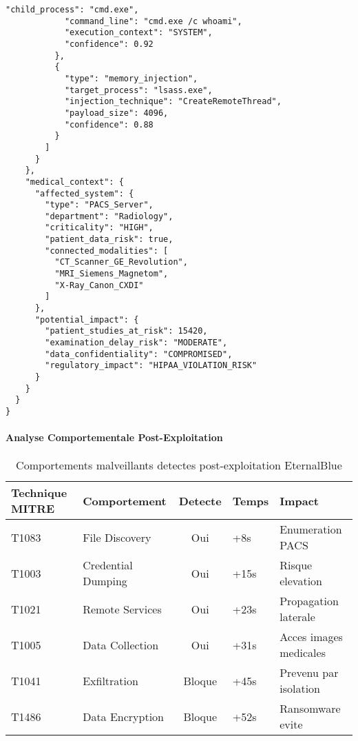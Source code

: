 \begin{lstlisting}[style=jsonstyle,caption=IOCs reseau extraits de l'incident EternalBlue]
            "child_process": "cmd.exe",
            "command_line": "cmd.exe /c whoami",
            "execution_context": "SYSTEM",
            "confidence": 0.92
          },
          {
            "type": "memory_injection",
            "target_process": "lsass.exe", 
            "injection_technique": "CreateRemoteThread",
            "payload_size": 4096,
            "confidence": 0.88
          }
        ]
      }
    },
    "medical_context": {
      "affected_system": {
        "type": "PACS_Server",
        "department": "Radiology",
        "criticality": "HIGH",
        "patient_data_risk": true,
        "connected_modalities": [
          "CT_Scanner_GE_Revolution",
          "MRI_Siemens_Magnetom",
          "X-Ray_Canon_CXDI"
        ]
      },
      "potential_impact": {
        "patient_studies_at_risk": 15420,
        "examination_delay_risk": "MODERATE",
        "data_confidentiality": "COMPROMISED",
        "regulatory_impact": "HIPAA_VIOLATION_RISK"
      }
    }
  }
}
\end{lstlisting}

\paragraph{Analyse Comportementale Post-Exploitation}

\begin{table}[H]
    \centering
    \caption{Comportements malveillants detectes post-exploitation EternalBlue}
    \begin{tabular}{|l|l|c|l|l|}
        \hline
        \textbf{Technique MITRE} & \textbf{Comportement} & \textbf{Detecte} & \textbf{Temps} & \textbf{Impact}        \\
        \hline
        T1083                    & File Discovery        & Oui              & +8s            & Enumeration PACS       \\
        \hline
        T1003                    & Credential Dumping    & Oui              & +15s           & Risque elevation       \\
        \hline
        T1021                    & Remote Services       & Oui              & +23s           & Propagation laterale   \\
        \hline
        T1005                    & Data Collection       & Oui              & +31s           & Acces images medicales \\
        \hline
        T1041                    & Exfiltration          & Bloque           & +45s           & Prevenu par isolation  \\
        \hline
        T1486                    & Data Encryption       & Bloque           & +52s           & Ransomware evite       \\
        \hline
    \end{tabular}
\end{table}

